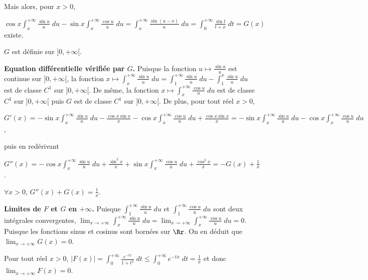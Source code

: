 {{Mais alors, pour $x>0$,

\begin{center}
$\cos x\int_{x}^{+\infty} \frac{\sin u}{u}\;du-\sin x\int_{x}^{+\infty} \frac{\cos u}{u}\;du=\int_{x}^{+\infty} \frac{\sin(u-x)}{u}\;du=\int_{0}^{+\infty} \frac{\sin t}{t+x}\;dt=G(x)$ existe.
\end{center}

\begin{center}
$G$ est définie sur $]0,+\infty[$.
\end{center}

\textbf{Equation différentielle vérifiée par $G$.}  Puisque la fonction $u\mapsto \frac{\sin u}{u}$ est continue sur $]0,+\infty[$, la fonction $x\mapsto\int_{x}^{+\infty} \frac{\sin u}{u}\;du=\int_{1}^{+\infty} \frac{\sin u}{u}\;du-\int_{1}^{x} \frac{\sin u}{u}\;du$ est de classe $C^1$ sur $]0,+\infty[$. De même, la fonction $x\mapsto\int_{x}^{+\infty} \frac{\cos u}{u}\;du$ est de classe $C^1$ sur $]0,+\infty[$ puis $G$ est de classe $C^1$ sur $]0,+\infty[$. De plus, pour tout réel $x>0$,

\begin{center}
$G'(x)=-\sin x\int_{x}^{+\infty} \frac{\sin u}{u}\;du- \frac{\cos x\sin x}{x}-\cos x\int_{x}^{+\infty} \frac{\cos u}{u}\;du+ \frac{\cos x\sin x}{x}=-\sin x\int_{x}^{+\infty} \frac{\sin u}{u}\;du-\cos x\int_{x}^{+\infty} \frac{\cos u}{u}\;du$,
\end{center}

puis en redérivant

\begin{center}
$G''(x)=-\cos x\int_{x}^{+\infty} \frac{\sin u}{u}\;du+ \frac{\sin^2x}{x}+\sin x\int_{x}^{+\infty} \frac{\cos u}{u}\;du+ \frac{\cos^2x}{x}=-G(x)+ \frac{1}{x}$.
\end{center}

\begin{center}
$\forall x>0$, $G''(x)+G(x)= \frac{1}{x}$.
\end{center}

\textbf{Limites de $F$ et $G$ en $+\infty$.} Puisque $\int_{1}^{+\infty} \frac{\sin u}{u}\;du$ et $\int_{1}^{+\infty} \frac{\cos u}{u}\;du$ sont deux intégrales convergentes, $\lim_{x \rightarrow +\infty}\int_{x}^{+\infty} \frac{\sin u}{u}\;du=\lim_{x \rightarrow +\infty}\int_{x}^{+\infty} \frac{\cos u}{u}\;du=0$. Puisque les fonctions sinus et cosinus sont bornées sur $\Rr$. On en déduit que $\lim_{x \rightarrow +\infty}G(x)=0$.

Pour tout réel $x>0$, $|F(x)|=\int_{0}^{+\infty} \frac{e^{-tx}}{1+t^2}\;dt\leqslant\int_{0}^{+\infty}e^{-tx}\;dt= \frac{1}{x}$ et donc $\lim_{x \rightarrow +\infty}F(x)=0$.

}}
